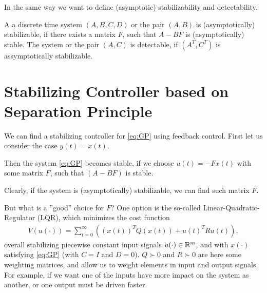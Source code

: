 In the same way we want to define (asymptotic) stabilizability and detectability. 
\begin{defi}
A a discrete time system $(A, B, C, D)$ or the pair $(A, B)$ is (asymptotically) stabilizable, if there exists a matrix $F$, such that $A - BF$ is (asymptotically) stable.
The system or the pair $(A,C)$ is detectable, if $(A^T, C^T)$ is assymptotically stabilizable. 
\end{defi}



\section{Stabilizing Controller based on Separation Principle}
\label{sch:stabilizingController}



We can find a stabilizing controller for \eqref{eq:GP} using feedback control.
First let us consider the case $y(t) = x(t)$.

%
%

Then the system \eqref{eq:GP} becomes stable, if we choose $u(t) = -Fx(t)$ with some matrix $F$, such that $(A - BF)$ is stable.

Clearly, if the system is (asymptotically) stabilizable, we can find such matrix $F$. 

But what is a ''good'' choice for $F$? One option is the so-called Linear-Quadratic-Regulator (LQR), which minimizes the cost function 
\begin{align}
\label{eq:costFcn}
V(u(\cdot)) = \sum_{t = 0}^\infty \left( (x(t))^T Q (x(t)) + u(t)^T R u(t)\right),
\end{align}
overall stabilizing piecewise constant input signals $u(\cdot) \in {\mathbb{R}}^m$, and with $x(\cdot)$ satisfying \eqref{eq:GP} (with $C = I$ and $D = 0$). 
$Q \succ 0$ and $R \succ 0$ are here some weighting matrices, and allow us  to weight elements in input and output signals. For example, if we want one of the inputs have more impact on the system as another, or one output must be driven faster. 

